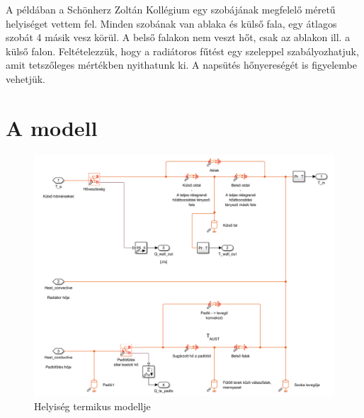 








 A példában a Schönherz Zoltán Kollégium egy szobájának megfelelő méretű helyiséget vettem fel. Minden szobának van ablaka és külső fala, egy átlagos szobát 4 másik vesz körül. A belső falakon nem veszt hőt, csak az ablakon ill. a külső falon. Feltételezzük, hogy a radiátoros fűtést egy szeleppel szabályozhatjuk, amit tetszőleges mértékben nyithatunk ki.
 A napsütés hőnyereségét is figyelembe vehetjük.%

\section{A modell}
\begin{figure}[H]
	\centering
	\includegraphics[trim=0 12 5 0, clip,width=\textwidth]{figures/SimscapeHouse}
	\caption{Helyiség termikus modellje}
	\label{fig:SimscapeHouse}
\end{figure}

